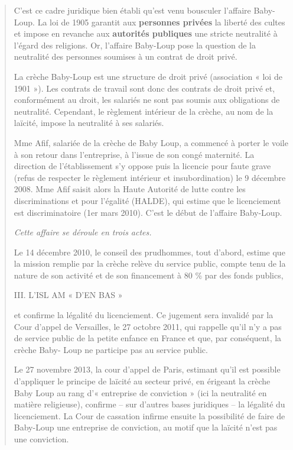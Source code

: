 \begin{quote}
C'est ce cadre juridique bien établi qu'est venu bousculer l'affaire
Baby-Loup. La loi de 1905 garantit aux \textbf{personnes privées} la
liberté des cultes et impose en revanche aux \textbf{autorités
publiques} une stricte neutralité à l'égard des religions. Or, l'affaire
Baby-Loup pose la question de la neutralité des personnes soumises à un
contrat de droit privé.

La crèche Baby-Loup est une structure de droit privé (association « loi
de 1901 »). Les contrats de travail sont donc des contrats de droit
privé et, conformément au droit, les salariés ne sont pas soumis aux
obligations de neutralité. Cependant, le règlement intérieur de la
crèche, au nom de la laïcité, impose la neutralité à ses salariés.

Mme Afif, salariée de la crèche de Baby Loup, a commencé à porter le
voile à son retour dans l'entreprise, à l'issue de son congé maternité.
La direction de l'établissement s'y oppose puis la licencie pour faute
grave (refus de respecter le règlement intérieur et insubordination) le
9 décembre 2008. Mme Afif saisit alors la Haute Autorité de lutte contre
les discriminations et pour l'égalité (HALDE), qui estime que le
licenciement est discriminatoire (1er mars 2010). C'est le début de
l'affaire Baby-Loup.

\emph{Cette affaire se déroule en trois actes.}

Le 14 décembre 2010, le conseil des prudhommes, tout d'abord, estime que
la mission remplie par la crèche relève du service public, compte tenu
de la nature de son activité et de son financement à 80 \% par des fonds
publics,

III. L'ISL AM « D'EN BAS »

et confirme la légalité du licenciement. Ce jugement sera invalidé par
la Cour d'appel de Versailles, le 27 octobre 2011, qui rappelle qu'il
n'y a pas de service public de la petite enfance en France et que, par
conséquent, la crèche Baby- Loup ne participe pas au service public.

Le 27 novembre 2013, la cour d'appel de Paris, estimant qu'il est
possible d'appliquer le principe de laïcité au secteur privé, en
érigeant la crèche Baby Loup au rang d'« entreprise de conviction » (ici
la neutralité en matière religieuse), confirme -- sur d'autres bases
juridiques -- la légalité du licenciement. La Cour de cassation infirme
ensuite la possibilité de faire de Baby-Loup une entreprise de
conviction, au motif que la laïcité n'est pas une conviction.


\end{quote}
